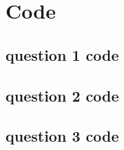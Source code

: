 \section{Code}\label{code}

\subsection{question 1 code}
%

\subsection{question 2 code}

\subsection{question 3 code}